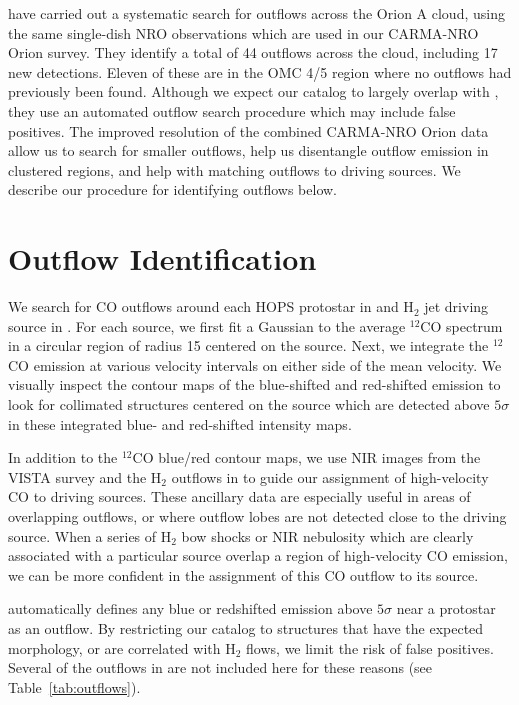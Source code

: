 \documentclass[twocolumn]{aastex63}
\newcommand{\co}[1][]{\ensuremath{^{#1}}CO}
\begin{document}
\citet{Tanabe:submitted} have carried out a systematic search for outflows across the Orion A cloud, using the same single-dish NRO observations which are used in our CARMA-NRO Orion survey. They identify a total of 44 outflows across the cloud, including 17 new detections. Eleven of these are in the OMC 4/5 region where no outflows had previously been found. Although we expect our catalog to largely overlap with \citet{Tanabe:submitted}, they use an automated outflow search procedure which may include false positives. The improved resolution of the combined CARMA-NRO Orion data allow us to search for smaller outflows, help us disentangle outflow emission in clustered regions, and help with matching outflows to driving sources. We describe our procedure for identifying outflows below.

\section{Outflow Identification}
\label{sec:identification}
We search for CO outflows around each HOPS protostar in \citet{Furlan16} and H$_2$ jet driving source in \citet{Davis09}. For each source, we first fit a Gaussian to the average \co[12] spectrum in a circular region of radius 15\arcsec{} centered on the source. Next, we integrate the \co[12] emission at various velocity intervals on either side of the mean velocity. We visually inspect the contour maps of the blue-shifted and red-shifted emission to look for collimated structures centered on the source which are detected above $5\sigma$ in these integrated blue- and red-shifted intensity maps.

In addition to the \co[12]{} blue/red contour maps, we use NIR images from the VISTA survey \citep{Meingast16} and the H$_2$ outflows in \citet{Davis09} to guide our assignment of high-velocity CO to driving sources. These ancillary data are especially useful in areas of overlapping outflows, or where outflow lobes are not detected close to the driving source. When a series of H$_2$ bow shocks or NIR nebulosity which are clearly associated with a particular source overlap a region of high-velocity CO emission, we can be more confident in the assignment of this CO outflow to its source.

\citet{Tanabe:submitted} automatically defines any blue or redshifted emission above $5\sigma$ near a protostar as an outflow. By restricting our catalog to structures that have the expected morphology, or are correlated with H$_2$ flows, we limit the risk of false positives. Several of the outflows in \citet{Tanabe:submitted} are not included here for these reasons (see Table~\ref{tab:outflows}).
\end{document}
